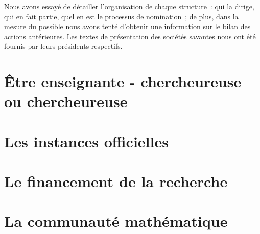 \documentclass[11pt]{book}
\renewcommand*{\mp}{\textperiodcentered}
\begin{document}
Nous avons essay\'e de d\'etailler l'organisation de chaque structure~:
qui la dirige, qui en fait partie, quel en est le processus de
nomination~; de plus, dans la mesure du possible nous avons tent\'e
d'obtenir une information sur le bilan des actions ant\'erieures.
Les textes de pr\'e\-sen\-ta\-tion des
soci\'et\'es savantes nous ont \'et\'e
fournis par leurs pr\'esidents respectifs.




\part{\^Etre enseignant\mp e - chercheur\mp euse ou chercheur\mp euse}








\part{Les instances officielles}


 







\part{Le financement de la recherche}





\part{La communaut\'e math\'ematique}








\printindex
\end{document}
